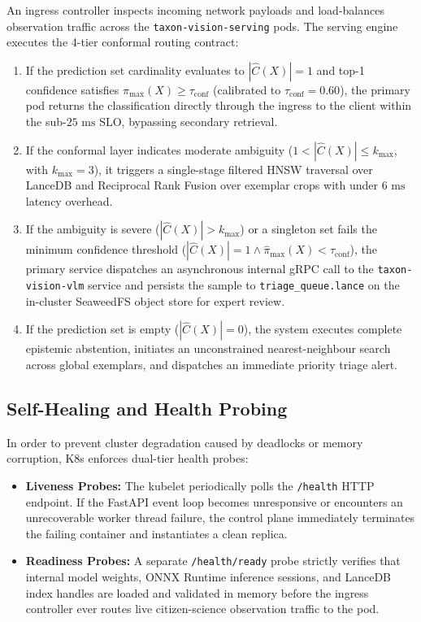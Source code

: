 An ingress controller inspects incoming network payloads and load-balances observation traffic across the \texttt{taxon-vision-serving} pods. The serving engine executes the 4-tier conformal routing contract:
\begin{enumerate}
    \item If the prediction set cardinality evaluates to $|\hat{C}(X)| = 1$ and top-1 confidence satisfies $\hat{\pi}_{\max}(X) \ge \tau_{\text{conf}}$ (calibrated to $\tau_{\text{conf}} = 0.60$), the primary pod returns the classification directly through the ingress to the client within the sub-$25\text{ ms}$ SLO, bypassing secondary retrieval.
    \item If the conformal layer indicates moderate ambiguity ($1 < |\hat{C}(X)| \le k_{\max}$, with $k_{\max} = 3$), it triggers a single-stage filtered HNSW traversal over LanceDB and Reciprocal Rank Fusion over exemplar crops with under $6\text{ ms}$ latency overhead.
    \item If the ambiguity is severe ($|\hat{C}(X)| > k_{\max}$) or a singleton set fails the minimum confidence threshold ($|\hat{C}(X)| = 1 \land \hat{\pi}_{\max}(X) < \tau_{\text{conf}}$), the primary service dispatches an asynchronous internal gRPC call to the \texttt{taxon-vision-vlm} service and persists the sample to \texttt{triage\_queue.lance} on the in-cluster SeaweedFS object store for expert review.
    \item If the prediction set is empty ($|\hat{C}(X)| = 0$), the system executes complete epistemic abstention, initiates an unconstrained nearest-neighbour search across global exemplars, and dispatches an immediate priority triage alert.
\end{enumerate}

\subsection{Self-Healing and Health Probing}
In order to prevent cluster degradation caused by deadlocks or memory corruption, K8s enforces dual-tier health probes:
\begin{itemize}
    \item \textbf{Liveness Probes:} The kubelet periodically polls the \texttt{/health} HTTP endpoint. If the FastAPI event loop becomes unresponsive or encounters an unrecoverable worker thread failure, the control plane immediately terminates the failing container and instantiates a clean replica.
    \item \textbf{Readiness Probes:} A separate \texttt{/health/ready} probe strictly verifies that internal model weights, ONNX Runtime inference sessions, and LanceDB index handles are loaded and validated in memory before the ingress controller ever routes live citizen-science observation traffic to the pod.
\end{itemize}

